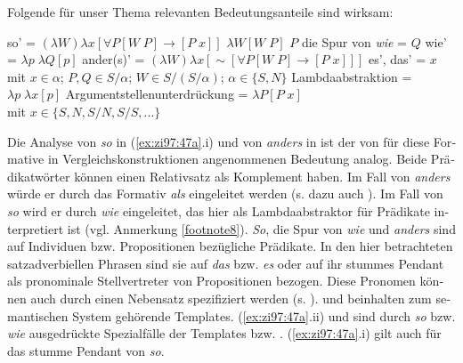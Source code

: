 \documentclass[output=paper, colorlinks, citecolor=brown, booklanguage=german]{langscibook}
\begin{document}
\begin{otherlanguage}{german}
Folgende für unser Thema relevanten Bedeutungsanteile sind wirksam:

\ea \label{ex:zi97:47} 
    \ea so' = \label{ex:zi97:47a}
        \ea $(\lambda W) \lambda x [\forall P [W \; P] \rightarrow [P \;x ]]$ \label{ex:zi97:47ai}
        \ex $\lambda W [W\; P]$ \label{ex:zi97:47aii}
        \ex $P$ \label{ex:zi97:47aiii}
        \z
    \ex die Spur von \textit{wie} = \newline $Q$ \label{ex:zi97:47b}
    \ex wie' = \newline $\lambda p \; \lambda Q [p]$ \label{ex:zi97:47c}
    \ex ander(s)' = \newline $(\lambda W) \lambda x [ \sim[\forall P [W \; P] \rightarrow [P \; x]]]$ \label{ex:zi97:47d}
    \ex es', das' = \newline $x$ \label{ex:zi97:47e} \\
    \vspace{5pt}
    \hspace*{-20pt} mit $x \in \alpha$; $P,Q \in S/\alpha$; $W \in S/(S/\alpha)$; $\alpha \in \{ S,N \}$
    \vspace{5pt}
    \ex Lambdaabstraktion = \newline $\lambda p \; \lambda x [p]$ \label{ex:zi97:47f}
    \ex Argumentstellenunterdrückung = \newline $\lambda P [P \; x]$ \label{ex:zi97:47g} \\
    \vspace{5pt}
    \hspace*{-20pt}mit $x \in \{S, N, S/N, S/S, ...\}$
    \z
\z

\noindent Die Analyse von \textit{so} in (\ref{ex:zi97:47a}.i) und von \textit{anders} in  ist der von \citet[95, 173, 191ff]{bierwisch1987semantikgraduierung} für diese Formative in Vergleichskonstruktionen angenommenen Bedeutung analog. Beide Prädikatwörter können einen Relativsatz als Komplement haben. Im Fall von \textit{anders} würde er durch das Formativ \textit{als} eingeleitet werden (s. dazu auch \citealt{zimmermann1987zursyntaxvonkomparationskonstruktionen}). Im Fall von \textit{so} wird er durch \textit{wie} eingeleitet, das hier als Lambdaabstraktor für Prädikate interpretiert ist (vgl. Anmerkung \ref{footnote8}). \textit{So}, die Spur von \textit{wie} und \textit{anders} sind auf Individuen bzw. Propositionen bezügliche Prädikate. In den hier betrachteten satzadverbiellen Phrasen sind sie auf \textit{das} bzw. \textit{es} oder auf ihr stummes Pendant als pronominale Stellvertreter von Propositionen bezogen. Diese Pronomen können auch durch einen Nebensatz spezifiziert werden (s. \citealt{zimmermann93}).  und  beinhalten zum semantischen System gehörende Templates. (\ref{ex:zi97:47a}.ii) und  sind durch \textit{so} bzw. \textit{wie} ausgedrückte Spezialfälle der Templates  bzw. . (\ref{ex:zi97:47a}.i) gilt auch für das stumme Pendant von \textit{so}.


\end{otherlanguage}
\end{document}
